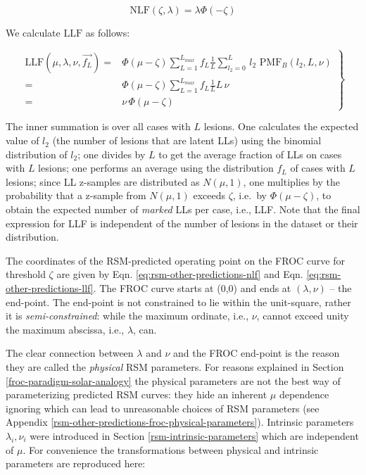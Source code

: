 \documentclass[
]{book}
\begin{document}
\begin{equation}
\text{NLF} \left ( \zeta, \lambda \right ) = \lambda \Phi \left (-\zeta \right )
\label{eq:rsm-other-predictions-nlf}
\end{equation}

We calculate \(\text{LLF}\) as follows:

\begin{equation} 
\left. 
\begin{aligned}
\text{LLF} \left ( \mu, \lambda, \nu, \overrightarrow{f_L} \right ) 
=& \Phi\left ( \mu - \zeta \right )\sum_{L=1}^{L_{max}} f_L \frac{1}{L} \sum_{l_2=0}^{L}  \, l_2 \,\,  \text{PMF}_{B}\left ( l_2, L, \nu \right )\\
=&\Phi\left ( \mu - \zeta \right )\sum_{L=1}^{L_{max}} f_L \frac{1}{L} L \,\nu\\
=&\nu \,\Phi\left ( \mu - \zeta \right )
\end{aligned}
\right \}
\label{eq:rsm-other-predictions-llf}
\end{equation}

The inner summation is over all cases with \(L\) lesions. One calculates the expected value of \(l_2\) (the number of lesions that are latent LLs) using the binomial distribution of \(l_2\); one divides by \(L\) to get the average fraction of LLs on cases with \(L\) lesions; one performs an average using the distribution \(f_L\) of cases with \(L\) lesions; since LL z-samples are distributed as \(N(\mu,1)\), one multiplies by the probability that a z-sample from \(N(\mu,1)\) exceeds \(\zeta\), i.e.~by \(\Phi(\mu-\zeta)\), to obtain the expected number of \emph{marked} LLs per case, i.e., LLF. Note that the final expression for LLF is independent of the number of lesions in the dataset or their distribution.

The coordinates of the RSM-predicted operating point on the FROC curve for threshold \(\zeta\) are given by Eqn. \eqref{eq:rsm-other-predictions-nlf} and Eqn. \eqref{eq:rsm-other-predictions-llf}. The FROC curve starts at (0,0) and ends at \(\left ( \lambda, \nu \right )\) -- the end-point. The end-point is not constrained to lie within the unit-square, rather it is \emph{semi-constrained}: while the maximum ordinate, i.e., \(\nu\), cannot exceed unity the maximum abscissa, i.e., \(\lambda\), can.

The clear connection between \(\lambda\) and \(\nu\) and the FROC end-point is the reason they are called the \emph{physical} RSM parameters. For reasons explained in Section \ref{froc-paradigm-solar-analogy} the physical parameters are not the best way of parameterizing predicted RSM curves: they hide an inherent \(\mu\) dependence ignoring which can lead to unreasonable choices of RSM parameters (see Appendix \ref{rsm-other-predictions-froc-physical-parameters}). Intrinsic parameters \(\lambda_i, \nu_i\) were introduced in Section \ref{rsm-intrinsic-parameters} which are independent of \(\mu\). For convenience the transformations between physical and intrinsic parameters are reproduced here:
\end{document}
